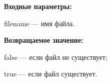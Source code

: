 \textbf{Входные параметры:}

filename --- имя файла.

\textbf{Возвращаемое значение:}

false --- если файл не существует;

true --- если файл существует.